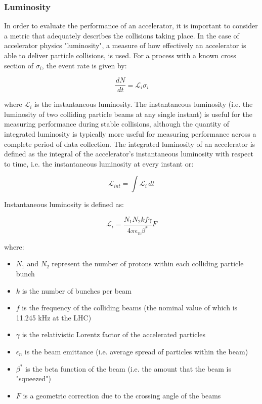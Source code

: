 \documentclass[12pt,a4paper,epsf,portrait,times,epsfig]{article}
\begin{document}

		\subsubsection{Luminosity}

		In order to evaluate the performance of an accelerator, it is important to consider a metric that adequately describes the collisions taking place. In the case of accelerator physics "luminosity", a measure of how effectively an accelerator is able to deliver particle collisions, is used. For a process with a known cross section of $\sigma_{i}$, the event rate is given by:
		
		\begin{equation}
			\frac{\,dN}{\,dt} = \mathcal{L}_{i}\sigma_{i}
		\end{equation}

		where $\mathcal{L}_{i}$ is the instantaneous luminosity. The instantaneous luminosity (i.e. the luminosity of two colliding particle beams at any single instant) is useful for the measuring performance during stable collisions, although the quantity of integrated luminosity is typically more useful for measuring performance across a complete period of data collection. The integrated luminosity of an accelerator is defined as the integral of the accelerator's instantaneous luminosity with respect to time, i.e. the instantaneous luminosity at every instant or:
		
		\begin{equation}
			\mathcal{L}_{int} = \int \mathcal{L}_{i} \,dt 			
		\end{equation}

		Instantaneous luminosity is defined as: 

		\begin{equation}
			\mathcal{L}_{i} = \frac{N_{1}N_{2}kf\gamma}{4\pi\epsilon_{n}\beta^{*}}F
		\end{equation}
		
		where:

		\begin{itemize}
			\item $N_{1}$ and $N_{2}$ represent the number of protons within each colliding particle bunch
			\item $k$ is the number of bunches per beam
			\item $f$ is the frequency of the colliding beams (the nominal value of which is 11.245 kHz at the LHC)
			\item $\gamma$ is the relativistic Lorentz factor of the accelerated particles
			\item $\epsilon_{n}$ is the beam emittance (i.e. average spread of particles within the beam)
			\item $\beta^{*}$ is the beta function of the beam (i.e. the amount that the beam is "squeezed")
			\item $F$ is a geometric correction due to the crossing angle of the beams
		\end{itemize}
\end{document}
